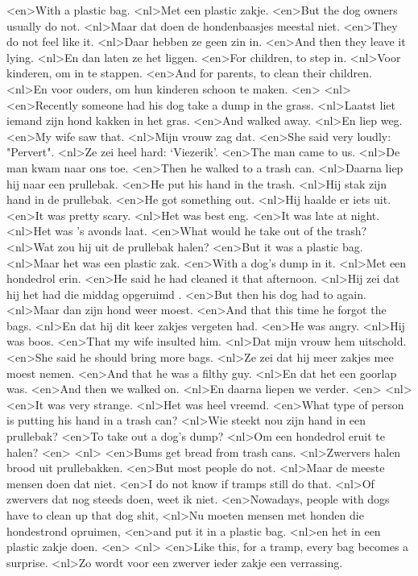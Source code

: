 <en>With a plastic bag.
<nl>Met een plastic zakje.
<en>But the dog owners usually do not.
<nl>Maar dat doen de hondenbaasjes meestal niet.
<en>They do not feel like it.
<nl>Daar hebben ze geen zin in.
<en>And then they leave it lying.
<nl>En dan laten ze het liggen.
<en>For children, to step in.
<nl>Voor kinderen, om in te stappen.
<en>And for parents, to clean their children.
<nl>En voor ouders, om hun kinderen schoon te maken.
<en>
<nl>
<en>Recently someone had his dog take a dump in the grass.
<nl>Laatst liet iemand zijn hond kakken in het gras.
<en>And walked away.
<nl>En liep weg.
<en>My wife saw that.
<nl>Mijn vrouw zag dat.
<en>She said very loudly: "Pervert".
<nl>Ze zei heel hard: `Viezerik'.
<en>The man came to us.
<nl>De man kwam naar ons toe.
<en>Then he walked to a trash can.
<nl>Daarna liep hij naar een prullebak.
<en>He put his hand in the trash.
<nl>Hij stak zijn hand in de prullebak.
<en>He got something out.
<nl>Hij haalde er iets uit.
<en>It was pretty scary.
<nl>Het was best eng.
<en>It was late at night.
<nl>Het was 's avonds laat.
<en>What would he take out of the trash?
<nl>Wat zou hij uit de prullebak halen?
<en>But it was a plastic bag.
<nl>Maar het was een plastic zak.
<en>With a dog's dump in it.
<nl>Met een hondedrol erin.
<en>He said he had  cleaned it that afternoon.
<nl>Hij zei dat hij het had die middag opgeruimd .
<en>But then his dog had to again.
<nl>Maar dan zijn hond weer moest.
<en>And that this time he forgot the bags.
<nl>En dat hij dit keer zakjes vergeten had.
<en>He was angry.
<nl>Hij was boos.
<en>That my wife insulted him.
<nl>Dat mijn vrouw hem uitschold.
<en>She said he should bring more bags.
<nl>Ze zei dat hij meer zakjes mee moest nemen.
<en>And that he  was a filthy guy.
<nl>En dat het een goorlap was.
<en>And then we walked on.
<nl>En daarna liepen we verder.
<en>
<nl>
<en>It was very strange.
<nl>Het was heel vreemd.
<en>What type of person is putting his hand in a trash can?
<nl>Wie steekt nou zijn hand in een prullebak?
<en>To take out a dog's dump?
<nl>Om een hondedrol eruit te halen?
<en>
<nl>
<en>Bums get bread from trash cans.
<nl>Zwervers halen brood uit prullebakken.
<en>But most people do not.
<nl>Maar de meeste mensen doen dat niet.
<en>I do not know if tramps still do that.
<nl>Of zwervers dat nog steeds doen, weet ik niet.
<en>Nowadays, people with dogs have to clean up that dog shit,
<nl>Nu moeten mensen met honden die hondestrond opruimen,
<en>and put it in a plastic bag.
<nl>en het in een plastic zakje doen.
<en>
<nl>
<en>Like this, for a tramp, every bag becomes a surprise.
<nl>Zo wordt voor een zwerver ieder zakje  een verrassing.
